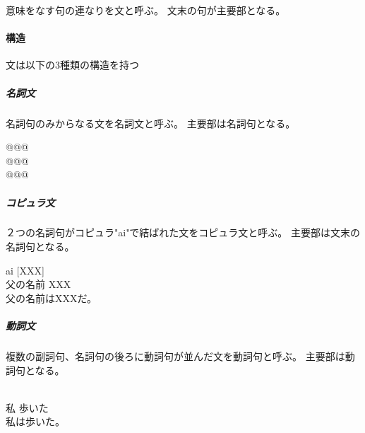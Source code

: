 意味をなす句の連なりを文と呼ぶ。
文末の句が主要部となる。

\paragraph{構造}
文は以下の3種類の構造を持つ

\subparagraph{名詞文}
名詞句のみからなる文を名詞文と呼ぶ。
主要部は名詞句となる。

\begin{exe}
    \ex \gll @@@\\
    @@@ \\
    \glt @@@
\end{exe}

\subparagraph{コピュラ文}
２つの名詞句がコピュラ"ai"で結ばれた文をコピュラ文と呼ぶ。
主要部は文末の名詞句となる。

\begin{exe}
    \ex \gll [u\'ak\'a ap\'a piku\'o] ai [XXX] \\
    父の名前 XXX \\
    \glt 父の名前はXXXだ。
\end{exe}

\subparagraph{動詞文}
複数の副詞句、名詞句の後ろに動詞句が並んだ文を動詞句と呼ぶ。
主要部は動詞句となる。

\begin{exe}
    \ex \gll [reap\'a] [t\'iv\'o-p\'a] \\
    私 歩いた \\
    \glt 私は歩いた。
\end{exe}